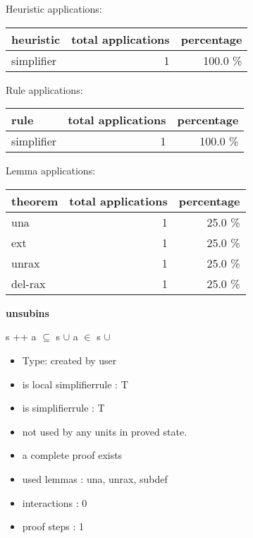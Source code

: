 \documentclass[a4paper]{article}
\begin{document}
\medskip


Heuristic applications:

\begin{supertabular}{l|r|r}
heuristic	& total applications & percentage \\ \hline
simplifier & 1 & 100.0 \% \\

\end{supertabular}

Rule applications:

\begin{supertabular}{l|r|r}
rule	        & total applications & percentage \\ \hline
simplifier & 1 & 100.0 \% \\

\end{supertabular}

Lemma applications:

\begin{supertabular}{l|r|r}
theorem	        & total applications & percentage \\ \hline
una & 1 & 25.0 \% \\
ext & 1 & 25.0 \% \\
unrax & 1 & 25.0 \% \\
del-rax & 1 & 25.0 \% \\

\end{supertabular}
\pagebreak

{\LARGE\bf unsubins}\label{lemma-unsubins}

\medskip

 \Fol s ++ a $\subseteq$ s $\cup$  \Equiv a $\in$ s $\cup$ 

\begin{itemize}

\item Type: created by user

\item is local simplifierrule : T
\item is simplifierrule : T
\item not used by any units in proved state.
\item       a complete proof exists
\item       used lemmas  : una, unrax, subdef
\item       interactions : 0
\item       proof steps  : 1
\end{itemize}
\end{document}
